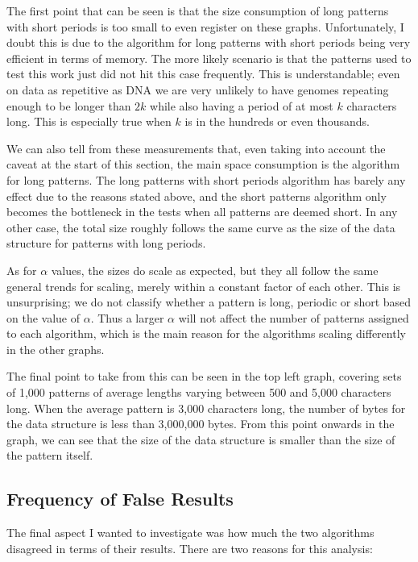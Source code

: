 \documentclass[ %
                    author={Dominic Joseph Moylett},
                    degree={MEng},
                     title={Dictionary Matching with Fingerprints},
                  subtitle={An Empirical Analysis},
                      type={research},
                      year={2015} ]{dissertation}
\begin{document}
The first point that can be seen is that the size consumption of long patterns with short periods is too small to even register on these graphs. Unfortunately, I doubt this is due to the algorithm for long patterns with short periods being very efficient in terms of memory. The more likely scenario is that the patterns used to test this work just did not hit this case frequently. This is understandable; even on data as repetitive as DNA we are very unlikely to have genomes repeating enough to be longer than $2k$ while also having a period of at most $k$ characters long. This is especially true when $k$ is in the hundreds or even thousands.

We can also tell from these measurements that, even taking into account the caveat at the start of this section, the main space consumption is the algorithm for long patterns. The long patterns with short periods algorithm has barely any effect due to the reasons stated above, and the short patterns algorithm only becomes the bottleneck in the tests when all patterns are deemed short. In any other case, the total size roughly follows the same curve as the size of the data structure for patterns with long periods.

As for $\alpha$ values, the sizes do scale as expected, but they all follow the same general trends for scaling, merely within a constant factor of each other. This is unsurprising; we do not classify whether a pattern is long, periodic or short based on the value of $\alpha$. Thus a larger $\alpha$ will not affect the number of patterns assigned to each algorithm, which is the main reason for the algorithms scaling differently in the other graphs.

The final point to take from this can be seen in the top left graph, covering sets of 1,000 patterns of average lengths varying between 500 and 5,000 characters long. When the average pattern is 3,000 characters long, the number of bytes for the data structure is less than 3,000,000 bytes. From this point onwards in the graph, we can see that the size of the data structure is smaller than the size of the pattern itself.

\subsection{Frequency of False Results}

The final aspect I wanted to investigate was how much the two algorithms disagreed in terms of their results. There are two reasons for this analysis:
\end{document}
